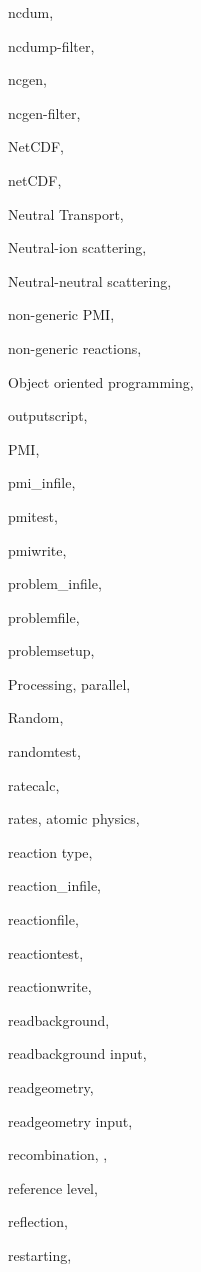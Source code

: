 \documentclass[12pt]{report}
\begin{document}
\begin{theindex}
  \indexspace

  \item ncdum, 
  \item ncdump-filter, 
  \item ncgen, 
  \item ncgen-filter, 
  \item NetCDF, 
  \item netCDF, 
  \item Neutral Transport, 
  \item Neutral-ion scattering, 
  \item Neutral-neutral scattering, 
  \item non-generic PMI, 
  \item non-generic reactions, 

  \indexspace

  \item Object oriented programming, 
  \item outputscript, 

  \indexspace

  \item PMI, 
  \item pmi\_infile, 
  \item pmitest, 
  \item pmiwrite, 
  \item problem\_infile, 
  \item problemfile, 
  \item problemsetup, 
  \item Processing, parallel, 

  \indexspace

  \item Random, 
  \item randomtest, 
  \item ratecalc, 
  \item rates, atomic physics, 
  \item reaction type, 
  \item reaction\_infile, 
  \item reactionfile, 
  \item reactiontest, 
  \item reactionwrite, 
  \item readbackground, 
  \item readbackground input, 
  \item readgeometry, 
  \item readgeometry input, 
  \item recombination, , 
  \item reference level, 
  \item reflection, 
  \item restarting, 


\end{theindex}
\end{document}
